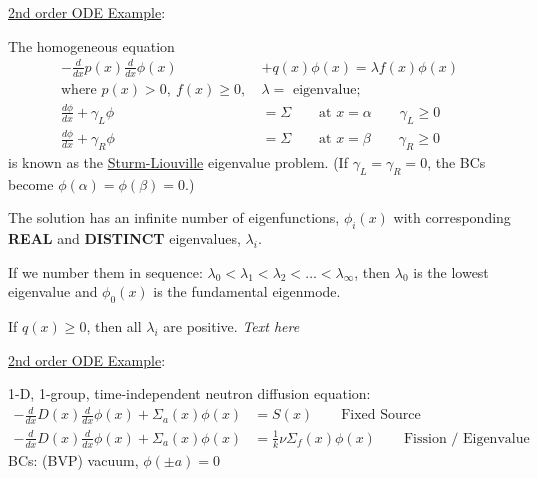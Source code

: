\documentclass[12pt, answers]{exam}
\newcommand{\Macro}{\ensuremath{\Sigma}}
\begin{document}
\vspace*{1em}
\underline{2nd order ODE Example}:

The homogeneous equation %
%
\begin{align}
-\frac{d}{dx}p(x) \frac{d}{dx}\phi(x) &+ q(x)\phi(x) = \lambda f(x) \phi(x) \nonumber \\
\text{where }p(x) > 0, \:f(x) \geq 0,\: &\lambda = \text{ eigenvalue;}\nonumber \\
\frac{d\phi}{dx} + \gamma_L \phi &= \Macro \qquad \text{at }x=\alpha \qquad \gamma_L \geq 0  \nonumber \\
\frac{d\phi}{dx} + \gamma_R \phi &= \Macro \qquad \text{at }x=\beta \qquad \gamma_R \geq 0\nonumber 
\end{align}
%
is known as the \underline{Sturm-Liouville} eigenvalue problem. (If $\gamma_L = \gamma_R = 0$, the BCs become $\phi(\alpha) = \phi(\beta) = 0$.)

The solution has an infinite number of eigenfunctions, $\phi_i(x)$ with corresponding \textbf{REAL} and \textbf{DISTINCT} eigenvalues, $\lambda_i$. 

\ifprintanswers
If we number them in sequence: $\lambda_0 < \lambda_1 < \lambda_2 < \dots < \lambda_{\infty}$, then $\lambda_0$ is the lowest eigenvalue and $\phi_0(x)$ is the fundamental eigenmode. 

If $q(x) \geq 0$, then all $\lambda_i$ are positive.
\else
 \vspace*{1em} \hspace*{8em} \textit{Text here} 
\fi

\vspace*{1em}
\underline{2nd order ODE Example}:

1-D, 1-group, time-independent neutron diffusion equation:
%
\begin{align}
-\frac{d}{dx}D(x)\frac{d}{dx}\phi(x) + \Macro_a(x)\phi(x) &= S(x) \qquad \text{Fixed Source} \nonumber \\
-\frac{d}{dx}D(x)\frac{d}{dx}\phi(x) + \Macro_a(x)\phi(x) &= \frac{1}{k} \nu \Macro_f(x) \phi(x)\qquad \text{Fission / Eigenvalue} \nonumber
\end{align}
%
BCs: (BVP) vacuum, $\phi(\pm a) = 0$
\end{document}
